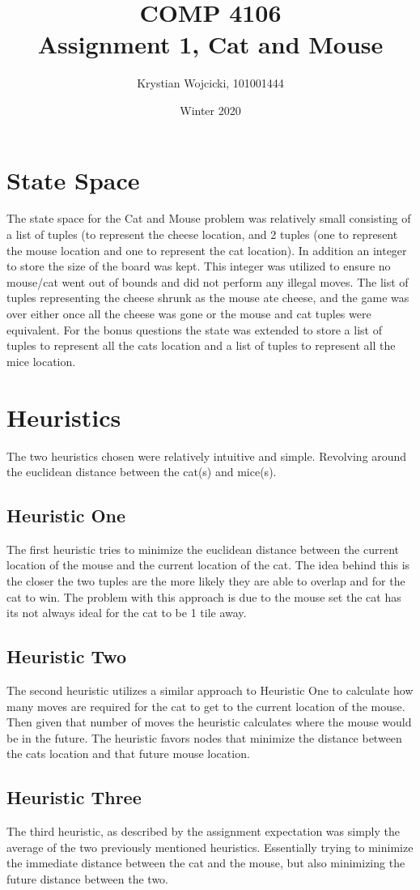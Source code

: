\documentclass{article}
\title{COMP 4106\\
	\large{Assignment 1, Cat and Mouse}}
\author{Krystian Wojcicki, 101001444}
\date{Winter 2020}
\begin{document}
\maketitle

\section{State Space}
The state space for the Cat and Mouse problem was relatively small consisting of a list of tuples (to represent the cheese location, and 2 tuples (one to represent the mouse location and one to represent the cat location). In addition an integer to store the size of the board was kept. This integer was utilized to ensure no mouse/cat went out of bounds and did not perform any illegal moves. The list of tuples representing the cheese shrunk as the mouse ate cheese, and the game was over either once all the cheese was gone or the mouse and cat tuples were equivalent. For the bonus questions the state was extended to store a list of tuples to represent all the cats location and a list of tuples to represent all the mice location. 

\section{Heuristics}

The two heuristics chosen were relatively intuitive and simple. Revolving around the euclidean distance between the cat(s) and mice(s).

\subsection{Heuristic One}
The first heuristic tries to minimize the euclidean distance between the current location of the mouse and the current location of the cat. The idea behind this is the closer the two tuples are the more likely they are able to overlap and for the cat to win. The problem with this approach is due to the mouse set the cat has its not always ideal for the cat to be 1 tile away.

\subsection{Heuristic Two}
The second heuristic utilizes a similar approach to Heuristic One to calculate how many moves are required for the cat to get to the current location of the mouse. Then given that number of moves the heuristic calculates where the mouse would be in the future. The heuristic favors nodes that minimize the distance between the cats location and that future mouse location.

\subsection{Heuristic Three}
The third heuristic, as described by the assignment expectation was simply the average of the two previously mentioned heuristics. Essentially trying to minimize the immediate distance between the cat and the mouse, but also minimizing the future distance between the two.
\end{document}

